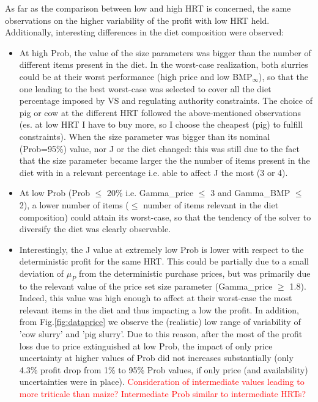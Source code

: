 As far as the comparison between low and high HRT is concerned, the same observations on the higher variability of the profit with low HRT held.
Additionally, interesting differences in the diet composition were observed:
\begin{itemize}
    \item At high Prob, the value of the size parameters was bigger than the number of different items present in the diet. In the worst-case realization, both slurries could be at their worst performance (high price and low BMP$_\infty$), so that the one leading to the best worst-case was selected to cover all the diet percentage imposed by VS and regulating authority constraints. The choice of pig or cow at the different HRT followed the above-mentioned observations (es. at low HRT I have to buy more, so I choose the cheapest (pig) to fulfill constraints). When the size parameter was bigger than its nominal (Prob=95\%) value, nor J or the diet changed: this was still due to the fact that the size parameter became larger the the number of items present in the diet with in a relevant percentage i.e. able to affect J the most (3 or 4).
    \item At low Prob (Prob $\leq$ 20\% i.e. Gamma\_price $\leq$ 3 and Gamma\_BMP $\leq$ 2), a lower number of items ($\leq$ number of items relevant in the diet composition) could attain its worst-case, so that the tendency of the solver to diversify the diet was clearly observable.
    \item Interestingly, the J value at extremely low Prob is lower with respect to the deterministic profit for the same HRT. This could be partially due to a small deviation of \emph{$\mu_P$} from the deterministic purchase prices, but was primarily due to the relevant value of the price set size parameter (Gamma\_price $\geq$ 1.8). Indeed, this value was high enough to affect at their worst-case the most relevant items in the diet and thus impacting a low the profit.
    In addition, from Fig.\ref{fig:dataprice} we observe the (realistic) low range of variability of 'cow slurry' and 'pig slurry'. Due to this reason, after the most of the profit loss due to price extinguished at low Prob, the impact of only price uncertainty at higher values of Prob did not increases substantially (only 4.3\% profit drop from 1\% to 95\% Prob values, if only price (and availability) uncertainties were in place).
    \textcolor{red}{Consideration of intermediate values leading to more triticale than maize? Intermediate Prob similar to intermediate HRTs?}
\end{itemize}

